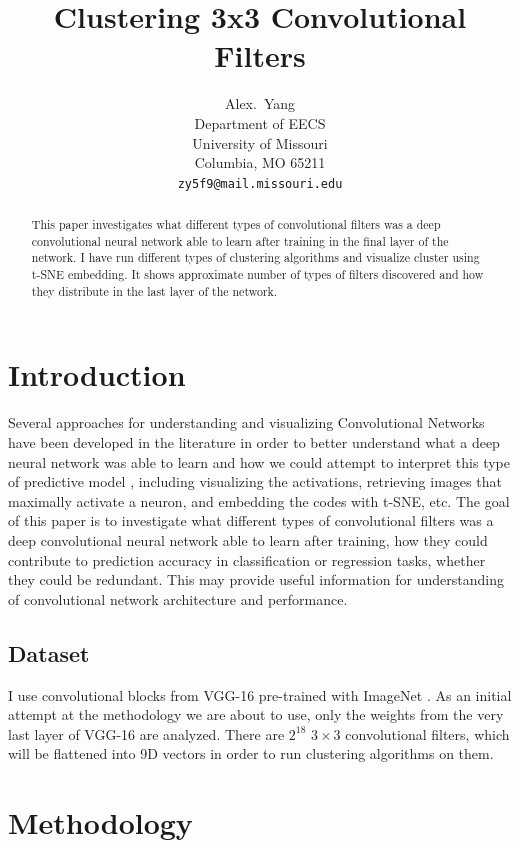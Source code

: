 \documentclass{article} %
\title{Clustering 3x3 Convolutional Filters}
\author{
Alex.~Yang \\
Department of EECS \\
University of Missouri\\
Columbia, MO 65211 \\
\texttt{zy5f9@mail.missouri.edu} \\
}
\begin{document}
\maketitle

\begin{abstract}
This paper investigates what different types of convolutional filters was a deep convolutional neural network able to learn after training in the final layer of the network. I have run different types of clustering algorithms and visualize cluster using t-SNE embedding. It shows approximate number of types of filters discovered and how they distribute in the last layer of the network.
\end{abstract}

\section{Introduction}

Several approaches for understanding and visualizing Convolutional Networks have been developed in the literature
in order to better understand what a deep neural network was able to learn
and how we could attempt to interpret this type of predictive model \cite{VisCNN},
including visualizing the activations, retrieving images that maximally activate a neuron,
and embedding the codes with t-SNE, etc.
The goal of this paper is to investigate what different types of convolutional filters was a deep convolutional neural network able to learn after training, how they could contribute to prediction accuracy in classification or regression tasks, whether they could be redundant.
This may provide useful information for understanding of convolutional network architecture and performance.

\subsection{Dataset}

I use convolutional blocks from VGG-16 \cite{VGG} pre-trained with ImageNet \cite{IMAGENET}.
As an initial attempt at the methodology we are about to use,
only the weights from the very last layer of VGG-16 are analyzed.
There are $2^{18}$ $3 \times 3$ convolutional filters,
which will be flattened into 9D vectors in order to run clustering algorithms on them.

\section{Methodology}
\end{document}
